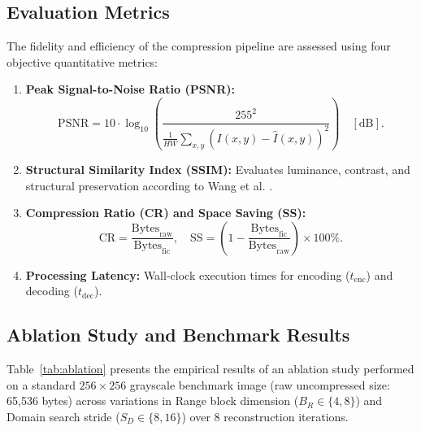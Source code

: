 \documentclass[11pt,a4paper]{article}
\begin{document}
\subsection{Evaluation Metrics}
The fidelity and efficiency of the compression pipeline are assessed using four objective quantitative metrics:
\begin{enumerate}
    \item \textbf{Peak Signal-to-Noise Ratio (PSNR):}
    \begin{equation}
        \text{PSNR} = 10 \cdot \log_{10} \left( \frac{255^2}{\frac{1}{HW}\sum_{x,y}(I(x,y) - \hat{I}(x,y))^2} \right) \quad [\text{dB}].
    \end{equation}
    \item \textbf{Structural Similarity Index (SSIM):} Evaluates luminance, contrast, and structural preservation according to Wang et al. \cite{wang2004image}.
    \item \textbf{Compression Ratio (CR) and Space Saving (SS):}
    \begin{equation}
        \text{CR} = \frac{\text{Bytes}_{\text{raw}}}{\text{Bytes}_{\text{fic}}}, \quad \text{SS} = \left( 1 - \frac{\text{Bytes}_{\text{fic}}}{\text{Bytes}_{\text{raw}}} \right) \times 100\%.
    \end{equation}
    \item \textbf{Processing Latency:} Wall-clock execution times for encoding ($t_{\text{enc}}$) and decoding ($t_{\text{dec}}$).
\end{enumerate}

\subsection{Ablation Study and Benchmark Results}
Table~\ref{tab:ablation} presents the empirical results of an ablation study performed on a standard $256 \times 256$ grayscale benchmark image (raw uncompressed size: 65,536 bytes) across variations in Range block dimension ($B_R \in \{4, 8\}$) and Domain search stride ($S_D \in \{8, 16\}$) over 8 reconstruction iterations.
\end{document}
